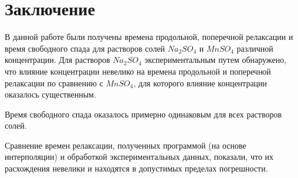 \section{Заключение}
В данной работе были получены времена продольной, поперечной релаксации 
и время свободного спада
для растворов солей $Na_2 SO_4$ и $Mn SO_4$ различной концентрации. Для растворов $ Na_2 SO_4 $ экспериментальным путем обнаружено, что влияние концентрации невелико на времена продольной и поперечной релаксации по сравнению с $ Mn SO_4 $, для которого влияние концентрации оказалось существенным.

Время
свободного спада
оказалось примерно одинаковым для всех растворов солей.

Сравнение времен релаксации, полученных программой (на основе интерполяции) и обработкой экспериментальных данных, показали, что их расхождения невелики и находятся в допустимых пределах погрешности.

